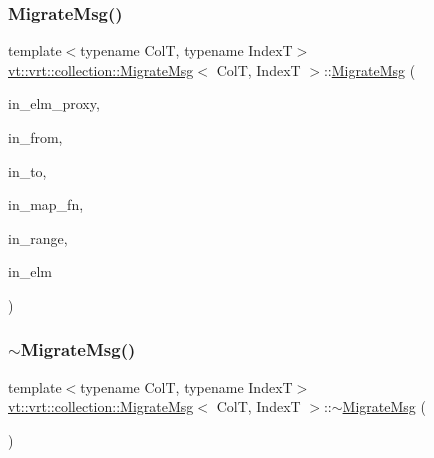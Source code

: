 \subsubsection{\texorpdfstring{Migrate\+Msg()}{MigrateMsg()}\hspace{0.1cm}{\footnotesize\ttfamily [2/2]}}
{\footnotesize\ttfamily template$<$typename ColT, typename IndexT$>$ \\
\hyperlink{structvt_1_1vrt_1_1collection_1_1_migrate_msg}{vt\+::vrt\+::collection\+::\+Migrate\+Msg}$<$ ColT, IndexT $>$\+::\hyperlink{structvt_1_1vrt_1_1collection_1_1_migrate_msg}{Migrate\+Msg} (\begin{DoxyParamCaption}\item[{\hyperlink{structvt_1_1vrt_1_1collection_1_1_vrt_elm_proxy}{Vrt\+Elm\+Proxy}$<$ ColT, IndexT $>$ const \&}]{in\+\_\+elm\+\_\+proxy,  }\item[{\hyperlink{namespacevt_a866da9d0efc19c0a1ce79e9e492f47e2}{Node\+Type} const \&}]{in\+\_\+from,  }\item[{\hyperlink{namespacevt_a866da9d0efc19c0a1ce79e9e492f47e2}{Node\+Type} const \&}]{in\+\_\+to,  }\item[{\hyperlink{namespacevt_af64846b57dfcaf104da3ef6967917573}{Handler\+Type} const \&}]{in\+\_\+map\+\_\+fn,  }\item[{IndexT const \&}]{in\+\_\+range,  }\item[{ColT $\ast$}]{in\+\_\+elm }\end{DoxyParamCaption})\hspace{0.3cm}{\ttfamily [inline]}}

\mbox{\label{structvt_1_1vrt_1_1collection_1_1_migrate_msg_a67874e771516da55d7509353dfa3a249}} 
\subsubsection{\texorpdfstring{$\sim$\+Migrate\+Msg()}{~MigrateMsg()}}
{\footnotesize\ttfamily template$<$typename ColT, typename IndexT$>$ \\
\hyperlink{structvt_1_1vrt_1_1collection_1_1_migrate_msg}{vt\+::vrt\+::collection\+::\+Migrate\+Msg}$<$ ColT, IndexT $>$\+::$\sim$\hyperlink{structvt_1_1vrt_1_1collection_1_1_migrate_msg}{Migrate\+Msg} (\begin{DoxyParamCaption}{ }\end{DoxyParamCaption})\hspace{0.3cm}{\ttfamily [inline]}}



